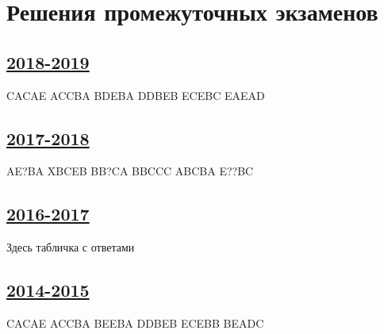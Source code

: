 \thispagestyle{empty}
\section{Решения промежуточных экзаменов}

\subsection[2018-2019]{\hyperref[sec:midterm_exam_2018_2019]{2018-2019}}
\label{sec:sol_midterm_exam_2018_2019}

CACAE ACCBA BDEBA DDBEB ECEBC EAEAD

\subsection[2017-2018]{\hyperref[sec:midterm_exam_2017_2018]{2017-2018}}
\label{sec:sol_midterm_exam_2017_2018}

AE?BA XBCEB BB?CA BBCCC ABCBA E??BC

\subsection[2016-2017]{\hyperref[sec:midterm_exam_2016_2017]{2016-2017}}
\label{sec:sol_midterm_exam_2016_2017}

Здесь табличка с ответами

\subsection[2014-2015]{\hyperref[sec:midterm_exam_2014_2015]{2014-2015}}
\label{sec:sol_midterm_exam_2014_2015}

CACAE ACCBA BEEBA DDBEB ECEBB BEADC